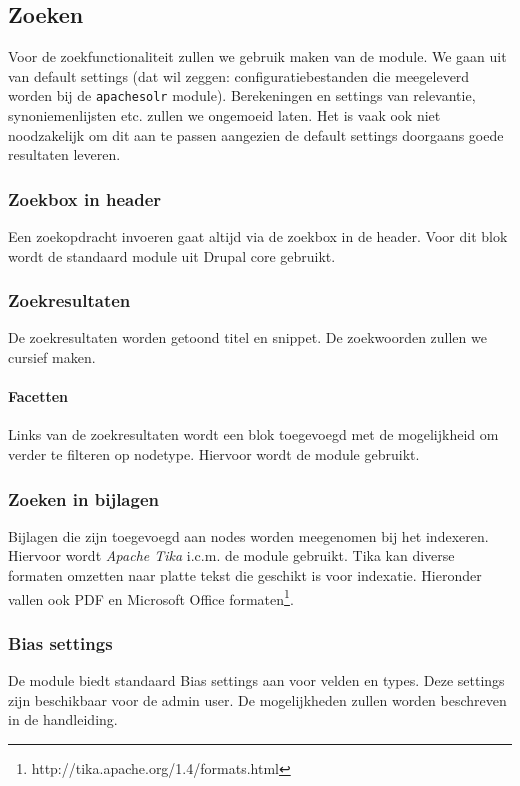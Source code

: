 \subsection{Zoeken}\label{zoeken}
Voor de zoekfunctionaliteit zullen we gebruik maken van de  module. We gaan uit van default settings (dat wil zeggen: configuratiebestanden die meegeleverd worden bij de \texttt{apachesolr} module). Berekeningen en settings van relevantie, synoniemenlijsten etc. zullen we ongemoeid laten. Het is vaak ook niet noodzakelijk om dit aan te passen aangezien de default settings doorgaans goede resultaten leveren.

\subsubsection{Zoekbox in header}
Een zoekopdracht invoeren gaat altijd via de zoekbox in de header. Voor dit blok wordt de standaard  module uit Drupal core gebruikt.

\subsubsection{Zoekresultaten}
De zoekresultaten worden getoond titel en snippet. De zoekwoorden zullen we cursief maken.

\paragraph{Facetten}
Links van de zoekresultaten wordt een blok toegevoegd met de mogelijkheid om verder te filteren op nodetype. Hiervoor wordt de  module gebruikt.

\subsubsection{Zoeken in bijlagen}
Bijlagen die zijn toegevoegd aan nodes worden meegenomen bij het indexeren. Hiervoor wordt \emph{Apache Tika} i.c.m. de  module gebruikt. Tika kan diverse formaten omzetten naar platte tekst die geschikt is voor indexatie. Hieronder vallen ook PDF en Microsoft Office formaten\footnote{http://tika.apache.org/1.4/formats.html}.

\subsubsection{Bias settings}
De  module biedt standaard Bias settings aan voor velden en types. Deze settings zijn beschikbaar voor de admin user. De mogelijkheden zullen worden beschreven in de handleiding.

